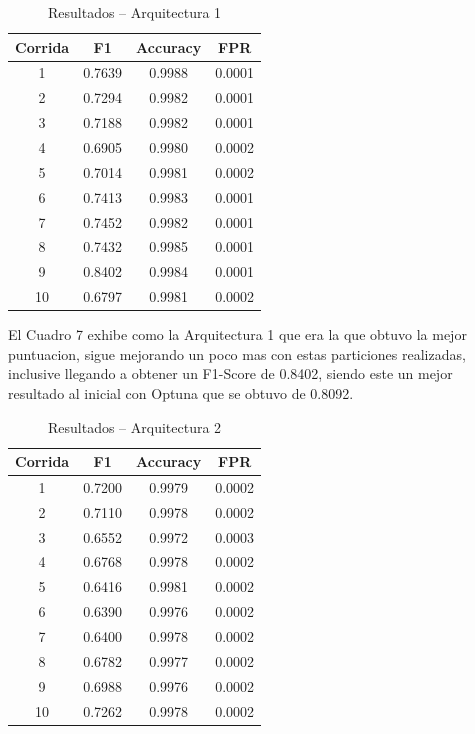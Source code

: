 \documentclass[12pt,a4paper]{article}
\begin{document}
\begin{table}[H]
  \centering
  \begin{tabular}{c c c c}
    \hline
    Corrida & F1 & Accuracy & FPR \\
    \hline
    1  & 0.7639 & 0.9988 & 0.0001 \\
    2  & 0.7294 & 0.9982 & 0.0001 \\
    3  & 0.7188 & 0.9982 & 0.0001 \\
    4  & 0.6905 & 0.9980 & 0.0002 \\
    5  & 0.7014 & 0.9981 & 0.0002 \\
    6  & 0.7413 & 0.9983 & 0.0001 \\
    7  & 0.7452 & 0.9982 & 0.0001 \\
    8  & 0.7432 & 0.9985 & 0.0001 \\
    9  & 0.8402 & 0.9984 & 0.0001 \\
    10 & 0.6797 & 0.9981 & 0.0002 \\
    \hline
  \end{tabular}
  \caption{Resultados – Arquitectura 1}
  \label{tab:corridas_arq1}
\end{table}

El Cuadro 7 exhibe como la Arquitectura 1 que era la que obtuvo la mejor puntuacion, sigue mejorando un poco
mas con estas particiones realizadas, inclusive llegando a obtener un F1-Score de 0.8402, siendo este un mejor resultado
al inicial con Optuna que se obtuvo de 0.8092.

\begin{table}[H]
  \centering
  \begin{tabular}{c c c c}
    \hline
    Corrida & F1 & Accuracy & FPR \\
    \hline
    1  & 0.7200 & 0.9979 & 0.0002 \\
    2  & 0.7110 & 0.9978 & 0.0002 \\
    3  & 0.6552 & 0.9972 & 0.0003 \\
    4  & 0.6768 & 0.9978 & 0.0002 \\
    5  & 0.6416 & 0.9981 & 0.0002 \\
    6  & 0.6390 & 0.9976 & 0.0002 \\
    7  & 0.6400 & 0.9978 & 0.0002 \\
    8  & 0.6782 & 0.9977 & 0.0002 \\
    9  & 0.6988 & 0.9976 & 0.0002 \\
    10 & 0.7262 & 0.9978 & 0.0002 \\
    \hline
  \end{tabular}
  \caption{Resultados – Arquitectura 2}
  \label{tab:corridas_arq2}
\end{table}
\end{document}
